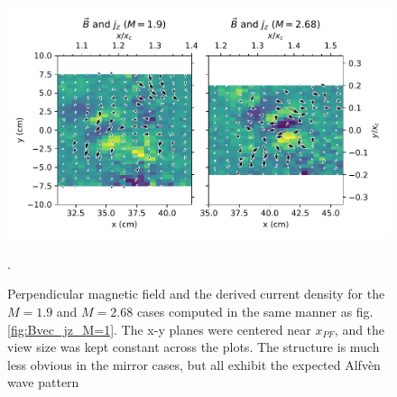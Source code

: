 \begin{figure}
    \centering
    \includegraphics[width=450pt]{figures/Bvec_Jz_M=1-9+2-68.pdf}
    \caption{Perpendicular magnetic field and the derived current density for the $M=1.9$ and $M=2.68$ cases computed in the same manner as fig. \ref{fig:Bvec_jz_M=1}. The x-y planes were centered near $x_{PF}$, and the view size was kept constant across the plots. The structure is much less obvious in the mirror cases, but all exhibit the expected Alfv\`en wave pattern}. 
    \label{fig:Bvec_jz_M=1-9+2-68}
\end{figure}

